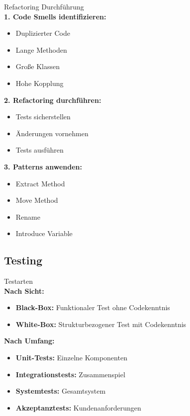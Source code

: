 \begin{KR}{Refactoring Durchführung}\\
\textbf{1. Code Smells identifizieren:}
\begin{itemize}
    \item Duplizierter Code
    \item Lange Methoden
    \item Große Klassen
    \item Hohe Kopplung
\end{itemize}

\textbf{2. Refactoring durchführen:}
\begin{itemize}
    \item Tests sicherstellen
    \item Änderungen vornehmen
    \item Tests ausführen
\end{itemize}

\textbf{3. Patterns anwenden:}
\begin{itemize}
    \item Extract Method
    \item Move Method
    \item Rename
    \item Introduce Variable
\end{itemize}
\end{KR}



\subsection{Testing}

\begin{definition}{Testarten}\\
\textbf{Nach Sicht:}
\begin{itemize}
    \item \textbf{Black-Box:} Funktionaler Test ohne Codekenntnis
    \item \textbf{White-Box:} Strukturbezogener Test mit Codekenntnis
\end{itemize}

\textbf{Nach Umfang:}
\begin{itemize}
    \item \textbf{Unit-Tests:} Einzelne Komponenten
    \item \textbf{Integrationstests:} Zusammenspiel
    \item \textbf{Systemtests:} Gesamtsystem
    \item \textbf{Akzeptanztests:} Kundenanforderungen
\end{itemize}
\end{definition}

